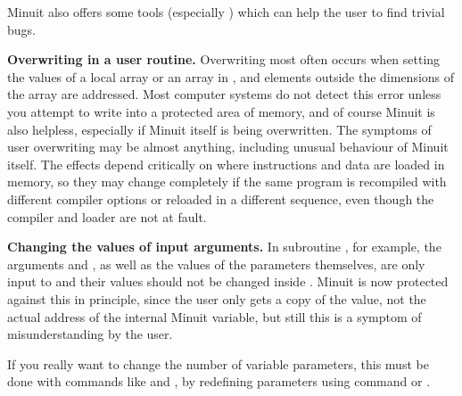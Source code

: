\begin{UL}
      Minuit also offers some tools (especially ) 
      which can help the user to find trivial bugs.
\item {\bf Overwriting in a user routine.}
      Overwriting most often occurs when setting the values of a local
      array or an array in , and elements outside the
      dimensions of the array are addressed.
      Most computer systems do not detect this error unless you attempt to
      write into a protected area of memory, and of course Minuit is also
      helpless, especially if Minuit itself is being overwritten.
      The symptoms of user overwriting may be almost anything,
      including unusual behaviour of Minuit itself.
      The effects depend critically on where instructions and data are
      loaded in memory, so they may change completely if the same
      program is recompiled with different compiler options or reloaded
      in a different sequence, even though the compiler and loader
      are not at fault.
\item {\bf Changing the values of input arguments.}
      In subroutine , for example, the arguments  and ,
      as well as the values of the parameters themselves, are only
      input to  and their values should not be changed inside .
      Minuit is now protected against this in principle, since
      the user only gets a copy of the value, not the actual address
      of the internal Minuit variable, but still this is a symptom of
      misunderstanding by the user.
       
      If you really want to change the number of variable parameters,
      this must be done with commands like  and , 
      by redefining parameters using command 
      or .
       

\end{UL}

